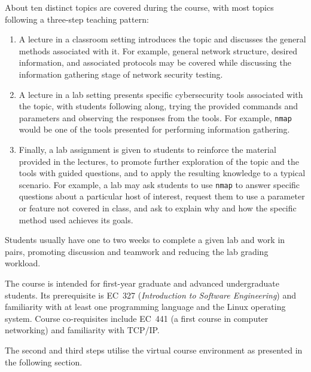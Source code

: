\documentclass{sig-alternate-2013}
\begin{document}
About ten distinct topics are covered during the course, with most topics following a three-step teaching pattern: 
\begin{enumerate}
\item A lecture in a classroom setting introduces the topic and discusses the general 
methods associated with it. For example, general network structure, desired information, and associated
protocols may be covered while discussing the information gathering stage
of network security testing.
\item A lecture in a lab setting presents specific cybersecurity tools associated with the topic, with
students following along, trying the provided commands and parameters and observing the responses from 
the tools. For example, \texttt{nmap} would be one of the tools presented for performing information gathering.
\item Finally, a lab assignment is given to students to reinforce the material provided in the lectures,
to promote further exploration of the topic and the tools with guided questions, and to apply the resulting
knowledge to a typical scenario. For example, a lab may ask students to use \texttt{nmap} to answer
specific questions about a particular host of interest, request them to use a parameter or feature
not covered in class, and ask to explain why and how the specific method used achieves its goals. 
\end{enumerate}

Students usually have one to two weeks to complete a given lab and
work in pairs, promoting discussion and teamwork and reducing the lab grading workload.

The course is intended for first-year graduate and advanced undergraduate students. 
Its prerequisite is EC~327 (\emph{Introduction to Software Engineering}) and familiarity with
at least one programming language and the Linux operating system. Course co-requisites include 
EC~441 (a first course in computer networking) and familiarity with TCP/IP.

The second and third steps utilise the virtual course environment as presented in the following section.
\end{document}
